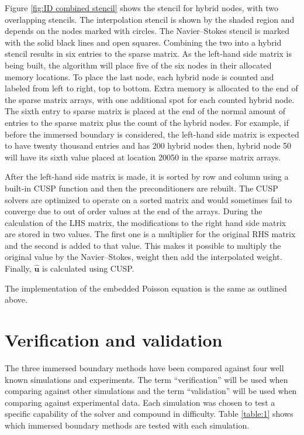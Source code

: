 Figure \ref{fig:ID combined stencil} shows the stencil for hybrid nodes, with two overlapping stencils. 
The interpolation stencil is shown by the shaded region and depends on the nodes marked with circles. 
The Navier--Stokes stencil is marked with the solid black lines and open squares.
Combining the two into a hybrid stencil results in six entries to the sparse matrix. 
As the left-hand side matrix is being built, the algorithm will place five of the six nodes in their allocated memory locations. 
To place the last node, each hybrid node is counted and labeled from left to right, top to bottom. 
Extra memory is allocated to the end of the sparse matrix arrays, with one additional spot for each counted hybrid node. 
The sixth entry to sparse matrix is placed at the end of the normal amount of entries to the sparse matrix plus the count of the hybrid nodes. 
For example, if before the immersed boundary is considered, the left-hand side matrix is expected to have twenty thousand entries and has 200 hybrid nodes then, hybrid node 50 will have its sixth value placed at location 20050 in the sparse matrix arrays. 

After the left-hand side matrix is made, it is sorted by row and column using a built-in CUSP function and then the preconditioners are rebuilt.
The CUSP solvers are optimized to operate on a sorted matrix and would sometimes fail to converge due to out of order values at the end of the arrays.
During the calculation of the LHS matrix, the modifications to the right hand side matrix are stored in two values.
The first one is a multiplier for the original RHS matrix and the second is added to that value.
This makes it possible to multiply the original value by the Navier--Stokes, weight then add the interpolated weight.
Finally, $\hat{\textbf{u}}$ is calculated using CUSP.

The implementation of the embedded Poisson equation is the same as outlined above.

\chapter{Verification and validation}\label{chapter:Validation}
The three immersed boundary methods have been compared against four well known simulations and experiments. 
The term ``verification'' will be used when comparing against other simulations and the term ``validation'' will be used when comparing against experimental data.
Each simulation was chosen to test a specific capability of the solver and compound in difficulty. 
Table \ref{table:1} shows which immersed boundary methods are tested with each simulation.

